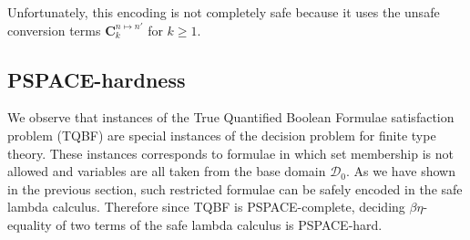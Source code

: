 Unfortunately, this encoding is not completely safe because it uses
the unsafe conversion terms $\mathbf{C}_k^{n\mapsto n'}$ for
$k\geq1$.



\subsection{PSPACE-hardness}
We observe that instances of the True Quantified Boolean Formulae
satisfaction problem (TQBF) are special instances of the decision
problem for finite type theory. These instances corresponds to
formulae in which set membership is not allowed and variables are
all taken from the base domain $\mathcal{D}_0$. As we have shown in
the previous section, such restricted formulae can be safely encoded
in the safe lambda calculus. Therefore since TQBF is
PSPACE-complete, deciding $\beta\eta$-equality of two terms of the
safe lambda calculus is PSPACE-hard.

